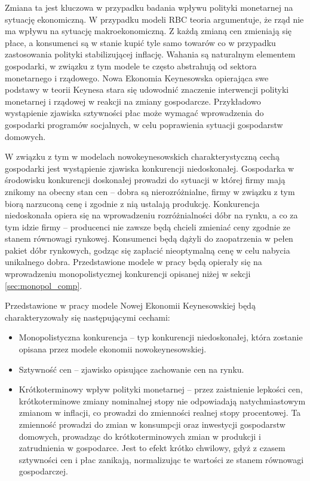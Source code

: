 Zmiana ta jest kluczowa w przypadku badania wpływu polityki monetarnej na sytuację ekonomiczną. W przypadku modeli RBC teoria argumentuje, że rząd nie ma wpływu na sytuację makroekonomiczną. Z każdą zmianą cen zmieniają się płace, a konsumenci są w stanie kupić tyle samo towarów co w przypadku zastosowania polityki stabilizującej inflację. Wahania są naturalnym elementem gospodarki, w związku z tym modele te często abstrahują od sektora monetarnego i rządowego. Nowa Ekonomia Keynesowska opierająca swe podstawy w teorii Keynesa stara się udowodnić znaczenie interwencji polityki monetarnej i rządowej w reakcji na zmiany gospodarcze. Przykładowo wystąpienie zjawiska sztywności płac może wymagać wprowadzenia do gospodarki programów socjalnych, w celu poprawienia sytuacji gospodarstw domowych.

W związku z tym w modelach nowokeynesowskich charakterystyczną cechą gospodarki jest wystąpienie zjawiska konkurencji niedoskonałej. Gospodarka w środowisku konkurencji doskonałej prowadzi do sytuacji w której firmy mają znikomy na obecny stan cen -- dobra są nierozróżnialne, firmy w związku z tym biorą narzuconą cenę i zgodnie z nią ustalają produkcję. Konkurencja niedoskonała opiera się na wprowadzeniu rozróżnialności dóbr na rynku, a co za tym idzie firmy -- producenci nie zawsze będą chcieli zmieniać ceny zgodnie ze stanem równowagi rynkowej. Konsumenci będą dążyli do zaopatrzenia w pełen pakiet dóbr rynkowych, godząc się zapłacić nieoptymalną cenę w celu nabycia unikalnego dobra. Przedstawione modele w pracy będą opierały się na wprowadzeniu monopolistycznej konkurencji opisanej niżej w sekcji \ref{sec:monopol_comp}.

Przedstawione w pracy modele Nowej Ekonomii Keynesowskiej będą charakteryzowały się następującymi cechami\cite{gali}:
\begin{itemize}
    \item Monopolistyczna konkurencja -- typ konkurencji niedoskonałej, która zostanie opisana przez modele ekonomii nowokeynesowskiej.
    \item Sztywność cen -- zjawisko opisujące zachowanie cen na rynku.
    \item Krótkoterminowy wpływ polityki monetarnej -- przez zaistnienie lepkości cen, krótkoterminowe zmiany nominalnej stopy nie odpowiadają natychmiastowym zmianom w inflacji, co prowadzi do zmienności realnej stopy procentowej. Ta zmienność prowadzi do zmian w konsumpcji oraz inwestycji gospodarstw domowych, prowadząc do krótkoterminowych zmian w produkcji i zatrudnienia w gospodarce. Jest to efekt krótko chwilowy, gdyż z czasem sztywności cen i płac zanikają, normalizując te wartości ze stanem równowagi gospodarczej.
\end{itemize}

